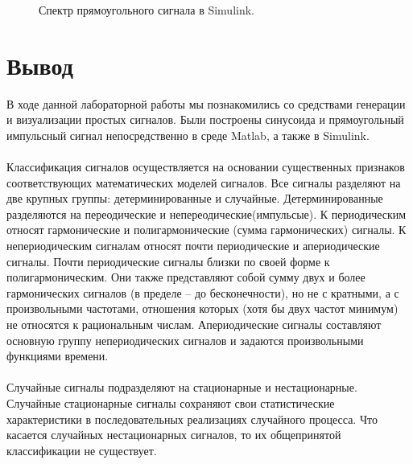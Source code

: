 \documentclass[12pt,a4paper]{scrartcl}
\begin{document}
\begin{figure}[h!]
\caption{Спектр прямоугольного сигнала в Simulink.}
\end{figure}
\newpage

\section{Вывод}
\label{sec:afterWork}
В ходе данной лабораторной работы мы познакомились со средствами генерации и визуализации простых сигналов. Были построены синусоида и прямоугольный импульсный сигнал непосредственно в среде Matlab, а также в Simulink.\\
\\
Классификация сигналов осуществляется на основании существенных признаков соответствующих математических моделей сигналов. Все сигналы разделяют на две крупных группы: детерминированные и случайные. Детерминированные разделяются на переодические и непереодические(импульсые). К периодическим относят гармонические и полигармонические (сумма гармонических) сигналы. К непериодическим сигналам относят почти периодические и апериодические сигналы. Почти периодические сигналы близки по своей форме к полигармоническим. Они также представляют собой сумму двух и более гармонических сигналов (в пределе – до бесконечности), но не с кратными, а с произвольными частотами, отношения которых (хотя бы двух частот минимум) не относятся к рациональным числам. Апериодические сигналы составляют основную группу непериодических сигналов и задаются произвольными функциями времени.\\
\\
Случайные сигналы подразделяют на стационарные и нестационарные. Случайные стационарные сигналы сохраняют свои статистические характеристики в последовательных реализациях случайного процесса. Что касается случайных нестационарных сигналов, то их общепринятой классификации не существует.
\end{document}
